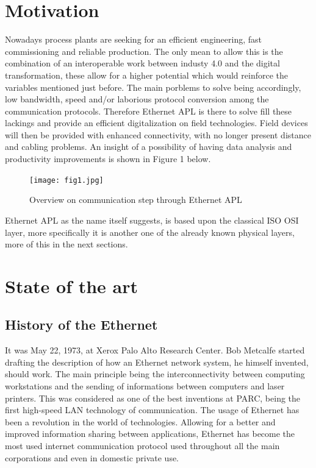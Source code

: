 \documentclass[conference]{IEEEtran}
\begin{document}
\section{Motivation}
Nowadays process plants are seeking for an efficient engineering, fast commissioning and reliable production. The only mean to allow this is the combination of an interoperable work between industy 4.0 and the digital transformation, these allow for a higher potential which would reinforce the variables mentioned just before. The main porblems to solve being accordingly, low bandwidth, speed and/or laborious protocol conversion among the communication protocols. Therefore Ethernet APL is there to solve fill these lackings and provide an efficient digitalization on field technologies. Field devices will then be provided with enhanced connectivity, with no longer present distance and cabling problems. An insight of a possibility of having data analysis and productivity improvements is shown in Figure 1 below.\cite{b1}
\begin{figure}[htbp]
    \centerline{\texttt{[image: fig1.jpg]}}
    \caption{Overview on communication step through Ethernet APL \cite{b1}}
    \label{comm}
\end{figure}

 Ethernet APL as the name itself suggests, is based upon the classical ISO OSI layer, more specifically it is another one of the already known physical layers, more of this in the next sections. 

\section{State of the art}
\subsection{History of the Ethernet}
It was May 22, 1973, at Xerox Palo Alto Research Center. Bob Metcalfe started drafting the description of how an Ethernet network system, he himself invented, should work. The main principle being the interconnectivity between computing workstations and the sending of informations between computers and laser printers. This was considered as one of the best inventions at PARC, being the first high-speed LAN technology of communication. The usage of Ethernet has been a revolution in the world of technologies. Allowing for a better and improved information sharing between applications, Ethernet has become the most used internet communication protocol used throughout all the main corporations and even in domestic private use. \cite{b2}
\end{document}
